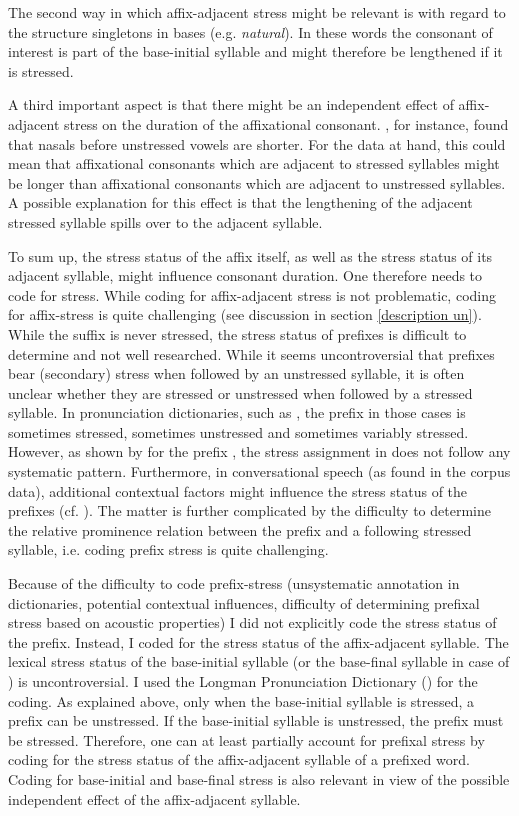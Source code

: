 The second way in which affix-adjacent stress might be relevant is with regard to the structure singletons in bases (e.g. \textit{natural}). In these words the consonant of interest is part of the base-initial syllable and might therefore be lengthened if it is stressed. 

A third important aspect is that there might be an independent effect of affix-adjacent stress on the duration of the affixational consonant. \cite{Umeda.1977}, for instance, found that nasals before unstressed vowels are shorter. For the data at hand, this could mean that affixational consonants which are adjacent to stressed syllables might be longer than affixational consonants which are adjacent to unstressed syllables. A possible explanation for this effect is that the lengthening of the adjacent stressed syllable spills over to the adjacent syllable. 

To sum up, the stress status of the affix itself, as well as the stress status of its adjacent syllable, might influence consonant duration. One therefore needs to code for stress.
While coding for affix-adjacent stress is not problematic, coding for affix-stress is quite challenging (see discussion in section \ref{description un}). 
While the suffix  is never stressed, the stress status of prefixes is difficult to determine and not well researched. While it seems uncontroversial that prefixes bear (secondary) stress when followed by an unstressed syllable, it is often unclear whether they are stressed or unstressed when followed by a stressed syllable. In pronunciation dictionaries, such as \cite{Wells.2008}, the prefix in those cases is sometimes stressed, sometimes unstressed and sometimes variably stressed. However, as shown by \cite{Hanote.2010} for the prefix , the stress assignment in \cite{Wells.2008} does not follow any systematic pattern. Furthermore, in conversational speech (as found in the corpus data), additional contextual factors might influence the stress status of the prefixes (cf. \citealt{Videau.2015}). The matter is further complicated by the difficulty to determine the relative prominence relation between the prefix and a following stressed syllable, i.e. coding prefix stress is quite challenging. 

Because of the difficulty to code prefix-stress (unsystematic annotation in dictionaries, potential contextual influences, difficulty of determining prefixal stress based on acoustic properties) I did not explicitly code the stress status of the prefix.
 Instead, I coded for the stress status of the affix-adjacent syllable. The lexical stress status of the base-initial syllable (or the base-final syllable in case of ) is uncontroversial. I used the Longman Pronunciation Dictionary (\citealt{Wells.2008}) for the coding.
 As explained above, only when the base-initial syllable is stressed, a prefix can be unstressed. If the base-initial syllable is unstressed, the prefix must be stressed. Therefore, one can at least partially account for prefixal stress by coding for the stress status of the affix-adjacent syllable of a prefixed word. 
 Coding for base-initial and base-final stress is also relevant in view of the possible independent effect of the affix-adjacent syllable. 
 
